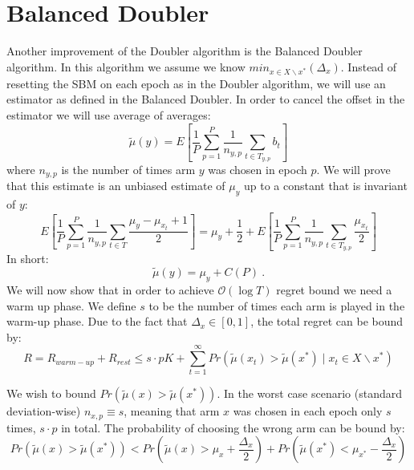 \documentclass[MSc,beforeExam]{iitcsthesis}
\begin{document}
	\section{Balanced Doubler}
		Another improvement of the Doubler algorithm is the Balanced Doubler algorithm. In this algorithm we assume we know $min_{x\in X \backslash x^*}(\Delta_x)$.
		Instead of resetting the SBM on each epoch as in the Doubler algorithm, we will use an estimator as defined in the Balanced Doubler.
In order to cancel the offset in the estimator we will use average of averages:
\begin{equation}
\tilde{\mu}(y) = E\left[ \frac{1}{P}\sum\limits_{p=1}^P \frac{1}{n_{y,p}} \sum\limits_{t\in T_{y,p}} b_t\right]
\end{equation}
where $n_{y,p}$ is the number of times arm $y$ was chosen in epoch $p$.
We will prove that this estimate is an unbiased estimate of $\mu_{y}$ up to a constant that is invariant of $y$:
\begin{equation*}
E\left[ \frac{1}{P}\sum\limits_{p=1}^P \frac{1}{n_{y,p}} \sum\limits_{t\in T} \frac{\mu_{y}-\mu_{x_t}+1}{2}\right]= \mu_{y} +\frac{1}{2} +E\left[ \frac{1}{P}\sum\limits_{p=1}^P \frac{1}{n_{y,p}} \sum\limits_{t\in T_{y,p}} \frac{\mu_{x_t}}{2}\right]
\end{equation*}
In short: 
\begin{equation}
\tilde{\mu}(y)  = \mu_{y} + C(P) \ .
\end{equation}
We will now show that in order to achieve $\mathcal{O}(\log T)$ regret bound we need a warm up phase.
We define $s$ to be the number of times each arm is played in the warm-up phase.
	Due to the fact that $\Delta_{x} \in [0,1]$, the total regret can be bound by:
	\begin{equation*}
	R=R_{warm-up}+R_{rest} \leq s \cdot p K + 
	\sum_{t=1}^{\infty}Pr\left(\tilde{\mu}(x_t)>\tilde{\mu}(x^*)\;|\;{x_t\in X \backslash x^*} \right)
	\end{equation*}
	
	We wish to bound $Pr(\tilde{\mu}(x)>\tilde{\mu}(x^*))$. 
	In the worst case scenario (standard deviation-wise) $n_{x,p} \equiv s$, meaning that arm $x$ was chosen in each epoch only $s$ times, $s\cdot p$ in total.
	The probability of choosing the wrong arm can be bound by:
	\begin{equation}\label{regret_bound}
	Pr(\tilde{\mu}(x)>\tilde{\mu}(x^*)) < 
	Pr(\tilde{\mu}(x) > \mu_{x} + \frac{\Delta_x}{2})+ 
	Pr(\tilde{\mu}(x^*)< \mu_{x^*} - \frac{\Delta_x}{2})
	\end{equation}
	
\end{document}
